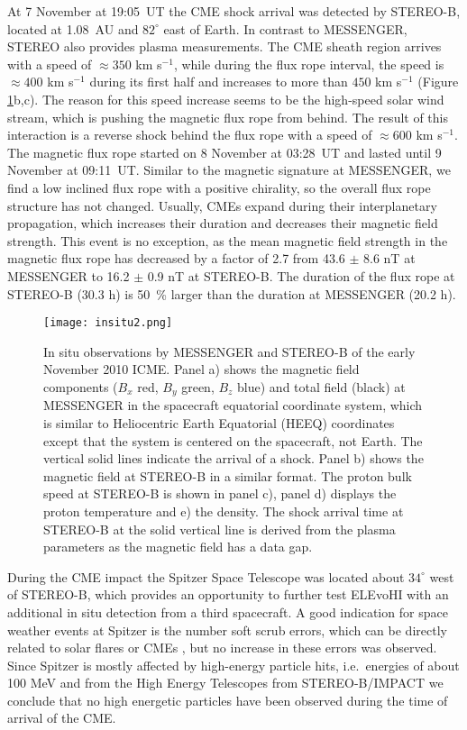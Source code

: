 \documentclass[draft]{agujournal}
\begin{document}
At 7 November at 19:05~UT the CME shock arrival was detected by STEREO-B, located at 1.08~AU and $82^\circ$ east of Earth. In contrast to MESSENGER, STEREO also provides plasma measurements. The CME sheath region arrives with a speed of $\approx 350$ km s$^{-1}$, while during the flux rope interval, the speed is $\approx 400$ km s$^{-1}$ during its first half and increases to more than $450$ km s$^{-1}$ (Figure \ref{fig:insitu}b,c). The reason for this speed increase seems to be the high-speed solar wind stream, which is pushing the magnetic flux rope from behind. The result of this interaction is a reverse shock behind the flux rope with a speed of $\approx 600$ km s$^{-1}$. The magnetic flux rope started on 8 November at 03:28~UT and lasted until 9 November at 09:11~UT. Similar to the magnetic signature at MESSENGER, we find a low inclined flux rope with a positive chirality, so the overall flux rope structure has not changed. 
Usually, CMEs expand during their interplanetary propagation, which increases their duration and decreases their magnetic field strength. This event is no exception, as the mean magnetic field strength in the magnetic flux rope has decreased by a factor of 2.7 from 43.6 $\pm$ 8.6 nT at MESSENGER to 16.2 $\pm$ 0.9 nT at STEREO-B. The duration of the flux rope at STEREO-B (30.3 h) is 50~\% larger than the duration at MESSENGER (20.2 h).

\begin{figure}[h]
\centering
\texttt{[image: insitu2.png]}
\caption{In situ observations by MESSENGER and STEREO-B of the early November 2010 ICME. Panel a) shows the magnetic field components ($B_x$ red, $B_y$ green, $B_z$ blue) and total field (black) at MESSENGER in the spacecraft equatorial coordinate system, which is similar to Heliocentric Earth Equatorial (HEEQ) coordinates except that the system is centered on the spacecraft, not Earth. The vertical solid lines indicate the arrival of  a shock.
Panel b) shows the magnetic field at STEREO-B in a similar format. The proton bulk speed at STEREO-B is shown in panel c), panel d) displays the proton temperature and e) the density. The shock arrival time at STEREO-B at the solid vertical line is derived from the plasma parameters as the magnetic field has a data gap.}
\label{fig:insitu}
\end{figure}

During the CME impact the Spitzer Space Telescope was located about $34^\circ$ west of STEREO-B, which provides an opportunity to further test ELEvoHI with an additional in situ detection from a third spacecraft. A good indication for space weather events at Spitzer is the number soft scrub errors, which can be directly related to solar flares or CMEs \citep[][]{chen14}, but no increase in these errors was observed. Since Spitzer is mostly affected by high-energy particle hits, i.e.\ energies of about 100 MeV and from the High Energy Telescopes from STEREO-B/IMPACT \citep[][]{luh08,vonros08} we conclude that no high energetic particles have been observed during the time of arrival of the CME. 
\end{document}
